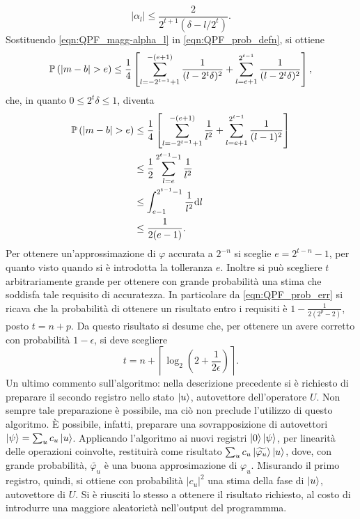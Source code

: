 \begin{equation}\label{eqn:QPF_magg-alpha_l}
 |\alpha_l| \leq \frac{2}{2^{t+1}(\delta - l/2^t)}.
\end{equation}
Sostituendo \eqref{eqn:QPF_magg-alpha_l} in \eqref{eqn:QPF_prob_defn}, si ottiene
\begin{equation}
 \P\left( |m-b| > e \right) \leq
 \frac{1}{4} \left[ \sum_{l=-2^{t-1} +1}^{-(e+1)} \frac{1}{(l - 2^t\delta)^2} + \sum_{l=e+1}^{2^{t-1}} \frac{1}{(l - 2^t\delta)^2} \right],
\end{equation}
che, in quanto $0 \leq 2^t \delta \leq 1$, diventa
\begin{align}
 \P\left( |m-b| > e \right) &\leq
 \frac{1}{4} \left[ \sum_{l=-2^{t-1} +1}^{-(e+1)} \frac{1}{l^2} + \sum_{l=e+1}^{2^{t-1}} \frac{1}{(l - 1)^2} \right]\\
 &\leq \frac{1}{2} \sum_{l=e}^{2^{t-1} - 1} \frac{1}{l^2}\\
 &\leq \int_{e-1}^{2^{t-1}-1} \frac{1}{l^2} \mathrm{d}l\\
 &\leq \frac{1}{2(e-1)}. \label{eqn:QPF_prob_err}
\end{align}
Per ottenere un'approssimazione di $\varphi$ accurata a $2^{-n}$ si sceglie ${e = 2^{t-n}-1}$, per quanto visto quando si è introdotta la tolleranza $e$. Inoltre si può scegliere $t$ arbitrariamente grande per ottenere con grande probabilità una stima che soddisfa tale requisito di accuratezza.
In particolare da \eqref{eqn:QPF_prob_err} si ricava che la probabilità  di ottenere un risultato entro i requisiti è $1 - \frac{1}{2(2^p-2)}$, posto $t = n + p$. 
Da questo risultato si desume che, per ottenere un avere corretto con probabilità $1 - \epsilon$, si deve scegliere
\begin{equation}
 t = n + \left\lceil \log_2 \left(2 + \frac{1}{2\epsilon} \right) \right\rceil.
\end{equation}
Un ultimo commento sull'algoritmo: nella descrizione precedente si è richiesto di preparare il secondo registro nello stato $\ket{u}$, autovettore dell'operatore $U$. Non sempre tale preparazione è possibile, ma ciò non preclude l'utilizzo di questo algoritmo.
È possibile, infatti, preparare una sovrapposizione di autovettori $\ket{\psi} = \sum_u c_u \ket{u}$.
Applicando l'algoritmo ai nuovi registri $\ket{0}\ket{\psi}$, per linearità delle operazioni coinvolte, restituirà come risultato $\sum_u c_u \ket{\widetilde{\varphi_u}} \ket{u}$, dove, con grande probabilità, $\widetilde{\varphi_u}$ è una buona approsimazione di $\varphi_u$.
Misurando il primo registro, quindi, si ottiene con probabilità $|c_u|^2$ una stima della fase di $\ket{u}$, autovettore di $U$.
Si è riusciti lo stesso a ottenere il risultato richiesto, al costo di introdurre una maggiore aleatorietà nell'output del programmma.

